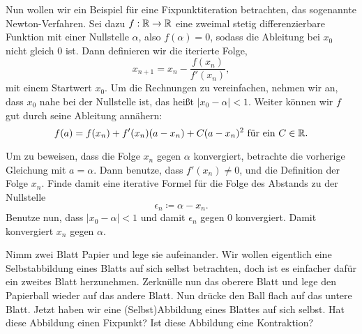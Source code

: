 \documentclass[a4paper,10pt]{article}
\begin{document}
\begin{Aufg}

Nun wollen wir ein Beispiel für eine Fixpunktiteration betrachten, das sogenannte
Newton-Verfahren. Sei dazu $f:\mathbb{R} \to \mathbb{R}$
eine zweimal stetig differenzierbare Funktion mit einer Nullstelle $\alpha$, also $f(\alpha) =0$,
sodass die Ableitung bei $x_0$ nicht gleich 0 ist. Dann definieren wir die iterierte Folge,
\[
 x_{n+1} = x_n - \frac{f(x_n)}{f'(x_n)}, 
\]
mit einem Startwert $x_0$. Um die Rechnungen zu vereinfachen, nehmen wir an, dass $x_0$ nahe bei
der Nullstelle ist, das heißt $|x_0 - \alpha|<1$. 
Weiter können wir $f$ gut durch seine Ableitung annähern:
\[
 f(a) = f(x_n) + f'(x_n)(a-x_n) + C(a-x_n)^2 \text{ für ein } C \in \mathbb{R}.
\]

Um zu beweisen, dass die Folge $x_n$ gegen $\alpha$ konvergiert, betrachte die vorherige
Gleichung mit $a = \alpha$. Dann benutze, dass $f'(x_n) \neq0$, und die Definition der
Folge $x_n$. Finde damit eine iterative Formel für die Folge des Abstands zu der Nullstelle
\[
 \epsilon_n \coloneqq \alpha - x_{n}.
\]
Benutze nun, dass $|x_0 - \alpha|<1$ und damit $\epsilon_n$ gegen 0 konvergiert. Damit konvergiert
$x_n$ gegen $\alpha$.

\end{Aufg}


\begin{Aufg}
Nimm zwei Blatt Papier und lege sie aufeinander. Wir wollen eigentlich eine Selbstabbildung
eines Blatts auf sich selbst betrachten, doch ist es einfacher dafür ein zweites Blatt herzunehmen.
Zerknülle nun das oberere Blatt und lege den Papierball wieder auf das andere Blatt. Nun drücke den 
Ball flach auf das untere Blatt. Jetzt haben wir eine (Selbst)Abbildung eines Blattes auf sich selbst.
Hat diese Abbildung einen Fixpunkt? Ist diese Abbildung eine Kontraktion?
 
\end{Aufg}
\begin{Aufg}
 
 
\end{Aufg}
\end{document}
